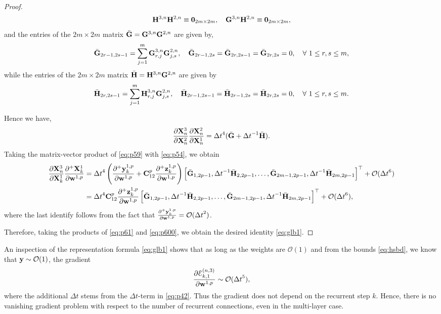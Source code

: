 \documentclass{article}
\newcommand{\by}{{\bf y}}
\newcommand{\bz}{{\bf z}}
\newcommand{\bw}{{\bf w}}
\newcommand{\bX}{{\bf X}}
\newcommand{\bC}{{\bf C}}
\newcommand{\ord}{{\mathcal O}}
\newcommand{\Dt}{{\Delta t}}
\newcommand{\E}{\EuScript{E}}
\begin{document}
\begin{proof}
\begin{equation}
\label{eq:p70}
{\bf H}^{3,n}{\bf H}^{2,n} \equiv {\bf 0}_{2m \times 2m}, \quad 
{\bf G}^{3,n}{\bf H}^{2,n} \equiv {\bf 0}_{2m \times 2m},
\end{equation}
and the entries of the $2m \times 2m$ matrix $\bar{\bf G} = {\bf G}^{3,n}{\bf G}^{2,n}$ are given by,
\begin{equation}
    \label{eq:p58}
    \bar{\bf G}_{2r-1,2s-1} = \sum\limits_{j=1}^m {\bf G}^{3,n}_{r,j} {\bf G}^{2,n}_{j,s}, \quad \bar{\bf G}_{2r-1,2s} = \bar{\bf G}_{2r,2s-1} = \bar{\bf G}_{2r,2s} = 0, \quad \forall~1\leq r,s\leq m,
\end{equation}
while the entries of the $2m \times 2m$ matrix $\bar{\bf H} = {\bf H}^{3,n}{\bf G}^{2,n}$ are given by
\begin{equation}
    \label{eq:H_bar}
    \bar{\bf H}_{2r,2s-1} = \sum\limits_{j=1}^m {\bf H}^{3,n}_{r,j} {\bf G}^{2,n}_{j,s}, \quad \bar{\bf H}_{2r-1,2s-1} = \bar{\bf H}_{2r-1,2s} = \bar{\bf H}_{2r,2s} = 0, \quad \forall~1\leq r,s\leq m.
\end{equation}

Hence we have,
\begin{equation}
    \label{eq:p59}
    \frac{\partial \bX^{3}_n}{\partial \bX^{2}_n}\frac{\partial \bX^{2}_n}{\partial \bX^{1}_n} = \Dt^4 (\bar{\bf G} + \Dt^{-1} \bar{\bf H}). 
\end{equation}
Taking the matrix-vector product of \eqref{eq:p59} with \eqref{eq:p54}, we obtain
\begin{equation}
    \label{eq:p600}
    \begin{aligned}
    \frac{\partial \bX^{3}_n}{\partial \bX^{1}_k}\frac{\partial^+\bX^1_k}{\partial \bw^{1,p}} &= \Dt^4\left(\frac{\partial^+\by^{1,p}_k}{\partial \bw^{1,p}}+\bC^p_{12}\frac{\partial^+\bz^{1,p}_k}{\partial \bw^{1,p}}\right)\left[\bar{\bf G}_{1,2p-1},\Dt^{-1}\bar{\bf H}_{2,2p-1},\ldots, \bar{\bf G}_{2m-1,2p-1},\Dt^{-1}\bar{\bf H}_{2m,2p-1}\right]^\top +\ord(\Dt^6) \\&=\Dt^4\bC^p_{12}\frac{\partial^+\bz^{1,p}_k}{\partial \bw^{1,p}}\left[\bar{\bf G}_{1,2p-1},\Dt^{-1}\bar{\bf H}_{2,2p-1},\ldots,\bar{\bf G}_{2m-1,2p-1},\Dt^{-1}\bar{\bf H}_{2m,2p-1}\right]^\top + \ord(\Dt^6),
    \end{aligned}
\end{equation}
where the last identify follows from the fact that $\frac{\partial^+\by^{1,p}_k}{\partial \bw^{1,p}} = \ord(\Dt^2)$.

 Therefore, taking the products of \eqref{eq:p61} and \eqref{eq:p600}, we obtain the desired identity \eqref{eq:glb1}. 
 
\end{proof}
An inspection of the representation formula \eqref{eq:glb1} shows that as long as the weights are $\ord(1)$ and from the bounds \eqref{eq:hsbd}, we know that $\by \sim \ord(1)$, the gradient $$
\frac{\partial \E^{(n,3)}_{k,1}}{\partial \bw^{1,p}} \sim \ord(\Dt^5),
$$
where the additional $\Dt$ stems from the $\Dt$-term in \eqref{eq:p42}. Thus the gradient does not depend on the recurrent step $k$. Hence, there is no vanishing gradient problem with respect to the number of recurrent connections, even in the multi-layer case. 
\end{document}
